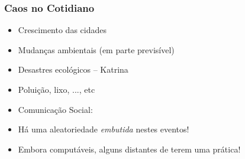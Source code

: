 \documentclass{beamer}
\begin{document}

\begin{frame}
\frametitle{Caos no Cotidiano}

\begin{block}{}%
  \begin{itemize}
   \item Crescimento das cidades

    \item Mudanças ambientais (em parte previsível)

    \item Desastres ecológicos -- Katrina

  \item Poluição, lixo, ..., etc

   \item Comunicação Social:
    
        \item<2-> Há uma aleatoriedade \textit{embutida} nestes eventos!
        
        \item<3-> Embora computáveis, alguns distantes de terem uma  prática!
        
    \end{itemize}
  
\end{block}


\end{frame}
\end{document}
